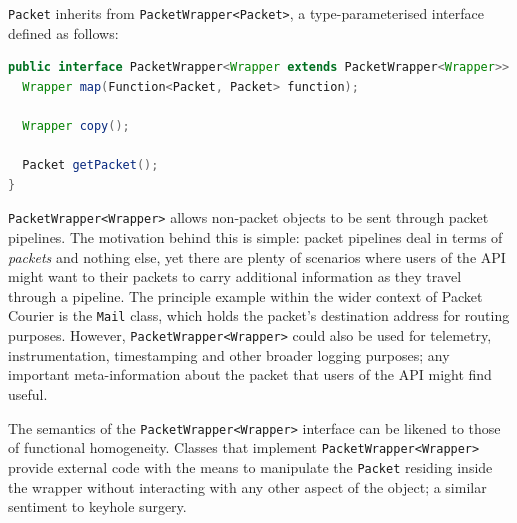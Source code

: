 \texttt{Packet} inherits from \texttt{PacketWrapper<Packet>}, a type-parameterised interface defined as follows:

\begin{lstlisting}[language=Java,caption={The \texttt{PacketWrapper<Wrapper>} interface exactly as it appears in the
codebase.},label={code:packet_wrapper_interface},captionpos=b]
public interface PacketWrapper<Wrapper extends PacketWrapper<Wrapper>> {
  Wrapper map(Function<Packet, Packet> function);

  Wrapper copy();

  Packet getPacket();
}
\end{lstlisting}


\texttt{PacketWrapper<Wrapper>} allows non-packet objects to be sent through packet pipelines. The motivation behind
this is simple: packet pipelines deal in terms of \emph{packets} and nothing else, yet there are plenty of scenarios
where users of the API might want to their packets to carry additional information as they travel through a pipeline.
The principle example within the wider context of Packet Courier is the \texttt{Mail} class, which holds the packet's
destination address for routing purposes. However, \texttt{PacketWrapper<Wrapper>} could also be used for telemetry,
instrumentation, timestamping and other broader logging purposes; any important meta-information about the packet
that users of the API might find useful.

The semantics of the \texttt{PacketWrapper<Wrapper>} interface can be likened to those of functional
homogeneity\cite{homogeneous_function}. Classes that implement \texttt{PacketWrapper<Wrapper>} provide external code
with the means to manipulate the \texttt{Packet} residing inside the wrapper without interacting with any other
aspect of the object; a similar sentiment to keyhole surgery\cite{keyhole_surgery}.

